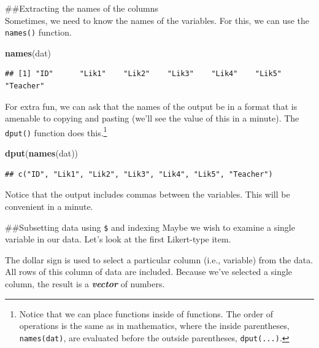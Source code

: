 \documentclass[]{tufte-handout}
\newenvironment{Shaded}{}{}
\newcommand{\KeywordTok}[1]{\textcolor[rgb]{0.00,0.44,0.13}{\textbf{#1}}}
\newcommand{\NormalTok}[1]{#1}
\newcommand{\OperatorTok}[1]{\textcolor[rgb]{0.40,0.40,0.40}{#1}}
\begin{document}
\#\#Extracting the names of the columns\\
Sometimes, we need to know the names of the variables. For this, we can
use the \texttt{names()} function.

\begin{Shaded}
\begin{Highlighting}[]
\KeywordTok{names}\NormalTok{(dat)}
\end{Highlighting}
\end{Shaded}

\begin{verbatim}
## [1] "ID"      "Lik1"    "Lik2"    "Lik3"    "Lik4"    "Lik5"    "Teacher"
\end{verbatim}

For extra fun, we can ask that the names of the output be in a format
that is amenable to copying and pasting (we'll see the value of this in
a minute). The \texttt{dput()} function does this.\footnote{Notice that
  we can place functions inside of functions. The order of operations is
  the same as in mathematics, where the inside parentheses,
  \texttt{names(dat)}, are evaluated before the outside parentheses,
  \texttt{dput(...)}.}

\begin{Shaded}
\begin{Highlighting}[]
\KeywordTok{dput}\NormalTok{(}\KeywordTok{names}\NormalTok{(dat))}
\end{Highlighting}
\end{Shaded}

\begin{verbatim}
## c("ID", "Lik1", "Lik2", "Lik3", "Lik4", "Lik5", "Teacher")
\end{verbatim}

Notice that the output includes commas between the variables. This will
be convenient in a minute.

\#\#Subsetting data using \texttt{\$} and indexing Maybe we wish to
examine a single variable in our data. Let's look at the first
Likert-type item.

\begin{marginfigure}
The dollar sign is used to select a particular column (i.e., variable)
from the data. All rows of this column of data are included. Because
we've selected a single column, the result is a \textbf{\emph{vector}}
of numbers.
\end{marginfigure}

\begin{Shaded}
\end{Shaded}
\end{document}
